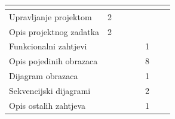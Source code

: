 					
						
			
			\begin{longtabu} to \textwidth {|X[7, l]|X[1, c]|X[1, c]|X[1, c]|X[1, c]|X[1, c]|X[1, c]|X[1, c]|}
								
				  &      &  &	 &	 &
				 &
				 &	 \\ \hline 
				\endfirsthead
				

				
				
				\endfoot
							
				 
				\endlastfoot
				
				Upravljanje projektom 		&2  &  &  &  &  &  & \\ \hline
				Opis projektnog zadatka 	&2  &  &  &  &  &  & \\ \hline
				
				Funkcionalni zahtjevi       &  &  &  &  &1  &  &  \\ \hline
				Opis pojedinih obrazaca 	&  &  &  &  &8  &  &  \\ \hline
				Dijagram obrazaca 			&  &  &  &  &1  &  &  \\ \hline
				Sekvencijski dijagrami 		&  &  &  &  &2  &  &  \\ \hline
				Opis ostalih zahtjeva 		&  &  &  &  &1  &  &  \\ \hline


\end{longtabu}
